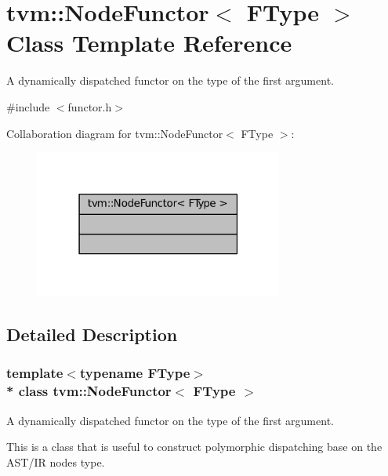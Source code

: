 \hypertarget{classtvm_1_1NodeFunctor}{}\section{tvm\+:\+:Node\+Functor$<$ F\+Type $>$ Class Template Reference}
\label{classtvm_1_1NodeFunctor}


A dynamically dispatched functor on the type of the first argument.  




{\ttfamily \#include $<$functor.\+h$>$}



Collaboration diagram for tvm\+:\+:Node\+Functor$<$ F\+Type $>$\+:
\nopagebreak
\begin{figure}[H]
\begin{center}
\leavevmode
\includegraphics[width=231pt]{classtvm_1_1NodeFunctor__coll__graph}
\end{center}
\end{figure}


\subsection{Detailed Description}
\subsubsection*{template$<$typename F\+Type$>$\\*
class tvm\+::\+Node\+Functor$<$ F\+Type $>$}

A dynamically dispatched functor on the type of the first argument. 

This is a class that is useful to construct polymorphic dispatching base on the A\+S\+T/\+IR node\textquotesingle{}s type.



